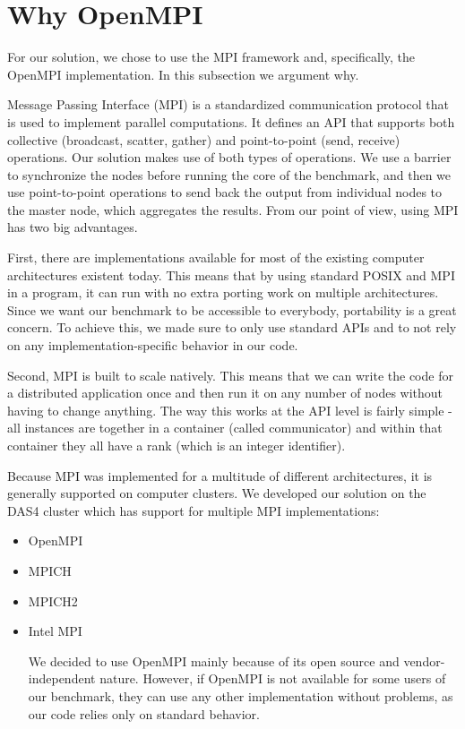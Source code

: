 

\section{Why OpenMPI}

For our solution, we chose to use the MPI framework and, specifically, the OpenMPI\cite{openmpi} implementation. In this subsection we argument why.

Message Passing Interface (MPI) is a standardized communication protocol that is used to implement parallel computations. It defines an API that supports both collective (broadcast, scatter, gather) and point-to-point (send, receive) operations. Our solution makes use of both types of operations. We use a barrier to synchronize the nodes before running the core of the benchmark, and then we use point-to-point operations to send back the output from individual nodes to the master node, which aggregates the results. From our point of view, using MPI has two big advantages.

First, there are implementations available for most of the existing computer architectures existent today\cite{mpi_implementations}. This means that by using standard POSIX and MPI in a program, it can run with no extra porting work on multiple architectures. Since we want our benchmark to be accessible to everybody, portability is a great concern. To achieve this, we made sure to only use standard APIs and to not rely on any implementation-specific behavior in our code.

Second, MPI is built to scale natively. This means that we can write the code for a distributed application once and then run it on any number of nodes without having to change anything. The way this works at the API level is fairly simple - all instances are together in a container (called communicator) and within that container they all have a rank (which is an integer identifier).


Because MPI was implemented for a multitude of different architectures, it is generally supported on computer clusters. We developed our solution on the DAS4\cite{das4} cluster which has support for multiple MPI implementations:

\begin{itemize}

\item OpenMPI
\item MPICH
\item MPICH2
\item Intel MPI

We decided to use OpenMPI mainly because of its open source and vendor-independent nature. However, if OpenMPI is not available for some users of our benchmark, they can use any other implementation without problems, as our code relies only on standard behavior.

\end{itemize}

